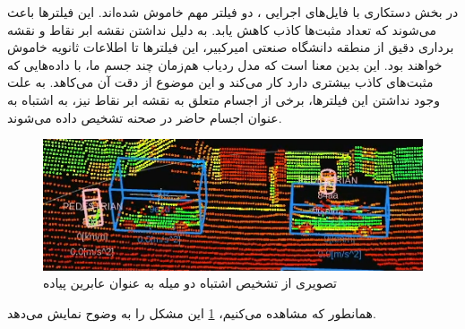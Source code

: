در بخش دستکاری با فایل‌های اجرایی ، دو فیلتر مهم خاموش شده‌اند. این فیلتر‌ها باعث می‌شوند که تعداد مثبت‌ها کاذب کاهش یابد. به دلیل نداشتن نقشه ابر نقاط و نقشه برداری دقیق از منطقه دانشگاه صنعتی امیرکبیر، این فیلترها تا اطلاعات ثانویه خاموش خواهند بود. این بدین معنا است که مدل ردیاب هم‌زمان چند جسم ما، با داده‌هایی که مثبت‌های کاذب بیشتری دارد کار می‌کند و این موضوع از دقت آن می‌کاهد. به علت وجود نداشتن این فیلتر‌ها، برخی از اجسام متعلق به نقشه ابر‌ نقاط نیز، به اشتباه به عنوان اجسام حاضر در صحنه تشخیص داده می‌شوند.
\begin{figure}[h!]
    \centering
    \includegraphics[width=1\linewidth]{figures/Pole_FP.png}
    \caption{تصویری از تشخیص اشتباه دو میله به عنوان عابرین پیاده}
    \label{fig:Pole_FP}
\end{figure}
همانطور که مشاهده می‌کنیم، \cref{fig:Pole_FP} این مشکل را به وضوح نمایش می‌دهد.

